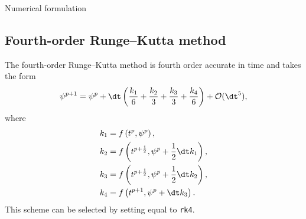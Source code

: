 \begin{chapter}{\label{cha:numerics}Numerical formulation}
  \subsection{Fourth-order Runge--Kutta method}
  The fourth-order Runge--Kutta method is fourth order accurate in time and
  takes the form
  \begin{equation*}
    \psi^{p+1} = \psi^{p} + \dt \left( \frac{k_{1}}{6} + \frac{k_{2}}{3} +
    \frac{k_{3}}{3} + \frac{k_{4}}{6} \right) + \mathcal{O}(\dt^{5}),
  \end{equation*}
  where
  \begin{equation*}
    \begin{aligned}
      k_{1} &= f\left( t^{p}, \psi^{p} \right), \\
      k_{2} &= f\left( t^{p+\frac{1}{2}}, \psi^{p} + \frac{1}{2}\dt k_{1}
      \right), \\
      k_{3} &= f\left( t^{p+\frac{1}{2}}, \psi^{p} + \frac{1}{2}\dt k_{2}
      \right), \\
      k_{4} &= f\left( t^{p+1}, \psi^{p} + \dt k_{3} \right).
    \end{aligned}
  \end{equation*}
  This scheme can be selected by setting  equal to \verb"rk4".


\end{chapter}
